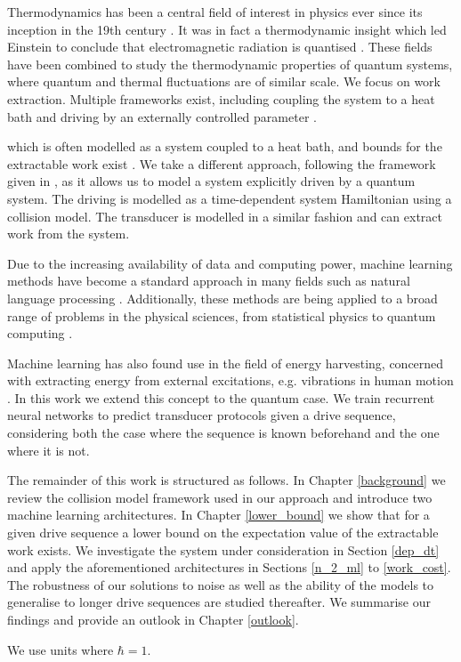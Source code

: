Thermodynamics has been a central field of interest in physics ever since its inception in the 19th century \cite{thomson_2011}.
It was in fact a thermodynamic insight which led Einstein to conclude that electromagnetic radiation is quantised \cite{1905AnP...322..132E}.
These fields have been combined to study the thermodynamic properties of quantum systems, where quantum and thermal fluctuations are of similar scale.
We focus on work extraction.
Multiple frameworks exist, including coupling the system to a heat bath \cite{Egloff_2015} and driving by an externally controlled parameter \cite{PhysRevA.101.022113}.


which is often modelled as a system coupled to a heat bath, and bounds for the extractable work exist \cite{Egloff_2015}.
We take a different approach, following the framework given in \cite{beyer2020}, as it allows us to model a system explicitly driven by a quantum system.
The driving is modelled as a time-dependent system Hamiltonian using a collision model.
The transducer is modelled in a similar fashion and can extract work from the system.

Due to the increasing availability of data and computing power, machine learning methods have become a standard approach in many fields such as natural language processing \cite{DBLP:journals/corr/VaswaniSPUJGKP17}.
Additionally, these methods are being applied to a broad range of problems in the physical sciences, from statistical physics to quantum computing \cite{Carleo_2019, wise2021using}.

Machine learning has also found use in the field of energy harvesting, concerned with extracting energy from external excitations, e.g. vibrations in human motion \cite{Liu2019}.
In this work we extend this concept to the quantum case.
We train recurrent neural networks to predict transducer protocols given a drive sequence, considering both the case where the sequence is known beforehand and the one where it is not.

The remainder of this work is structured as follows.
In Chapter \ref{background} we review the collision model framework used in our approach and introduce two machine learning architectures.
In Chapter \ref{lower_bound} we show that for a given drive sequence a lower bound on the expectation value of the extractable work exists.
We investigate the system under consideration in Section \ref{dep_dt} and apply the aforementioned architectures in Sections \ref{n_2_ml} to \ref{work_cost}.
The robustness of our solutions to noise as well as the ability of the models to generalise to longer drive sequences are studied thereafter.
We summarise our findings and provide an outlook in Chapter \ref{outlook}.

We use units where $\hbar = 1$.